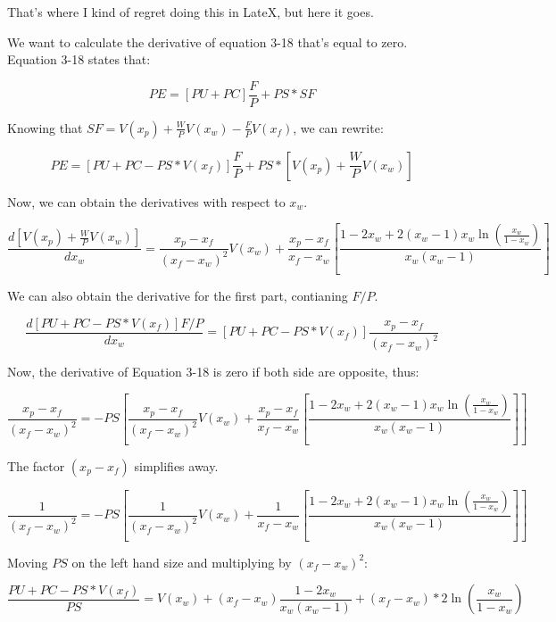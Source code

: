 That's where I kind of regret doing this in LateX, but here it goes.

We want to calculate the derivative of equation 3-18 that's equal to zero. Equation 3-18 states that:

\begin{equation}
PE = [PU + PC]\frac{F}{P} + PS*SF
\end{equation}

Knowing that $SF = V(x_p) + \frac{W}{P}V(x_w) - \frac{F}{P}V(x_f)$, we can rewrite:

\begin{equation}
PE = [PU + PC - PS*V(x_f)]\frac{F}{P} + PS*[V(x_p)+\frac{W}{P}V(x_w)]
\end{equation}

Now, we can obtain the derivatives with respect to $x_w$.

\begin{equation}
\frac{d[V(x_p)+\frac{W}{P}V(x_w)]}{dx_w} = \frac{x_p-x_f}{(x_f-x_w)^2}V(x_w) + \frac{x_p-x_f}{x_f-x_w}\left[\frac{1-2x_w+2(x_w-1)x_w\ln \left(\frac{x_w}{1-x_w}\right)}{x_w(x_w-1)}\right]
\end{equation}

We can also obtain the derivative for the first part, contianing $F/P$.


\begin{equation}
\frac{d[PU+PC-PS*V(x_f)]F/P}{dx_w} = [PU+PC-PS*V(x_f)]\frac{x_p-x_f}{(x_f-x_w)^2}
\end{equation}

Now, the derivative of Equation 3-18 is zero if both side are opposite, thus:

\begin{equation}
[PU+PC-PS*V(x_f)]\frac{x_p-x_f}{(x_f-x_w)^2} = -PS\left[ \frac{x_p-x_f}{(x_f-x_w)^2}V(x_w) + \frac{x_p-x_f}{x_f-x_w}\left[\frac{1-2x_w+2(x_w-1)x_w\ln \left(\frac{x_w}{1-x_w}\right)}{x_w(x_w-1)}\right] \right]
\end{equation}

The factor $(x_p-x_f)$ simplifies away.

\begin{equation}
[PU+PC-PS*V(x_f)]\frac{1}{(x_f-x_w)^2} = -PS\left[ \frac{1}{(x_f-x_w)^2}V(x_w) + \frac{1}{x_f-x_w}\left[\frac{1-2x_w+2(x_w-1)x_w\ln \left(\frac{x_w}{1-x_w}\right)}{x_w(x_w-1)}\right] \right]
\end{equation}

Moving $PS$ on the left hand size and multiplying by $(x_f-x_w)^2$:


\begin{equation}
\frac{PU+PC-PS*V(x_f)}{PS} = V(x_w) + (x_f-x_w)\frac{1-2x_w}{x_w(x_w-1)} +(x_f-x_w)* 2\ln \left(\frac{x_w}{1-x_w}\right)
\end{equation}

